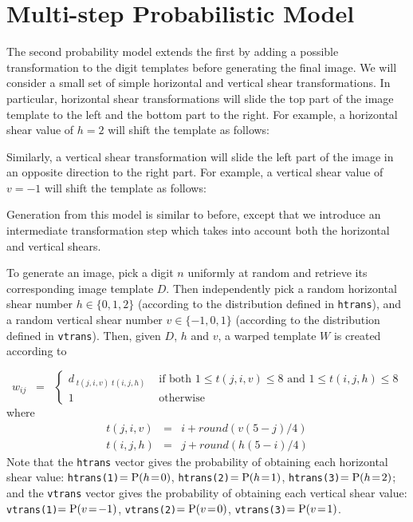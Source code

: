 \documentclass[12pt]{article}
\begin{document}
\section{Multi-step Probabilistic Model}

The second probability model extends the first by adding a possible 
transformation to the digit templates before generating the final image.
We will consider a small set of simple 
horizontal and vertical shear transformations.
In particular, horizontal shear transformations
will slide the top part of the image template to the left
and the bottom part to the right.
For example, a horizontal shear value of $h=2$ 
will shift the template as follows:



\noindent
Similarly, a vertical shear transformation will
slide the left part of the image
in an opposite direction to the right part.
For example, a vertical shear value of $v=-1$
will shift the template as follows:

\bigskip

\hspace*{2.2em}

\hspace*{1.49cm}

Generation from this model is similar to before,
except that we introduce an intermediate transformation
step which takes into account both the horizontal and
vertical shears.

\begin{center}

\end{center}

To generate an image, 
pick a digit $n$ uniformly at random 
and retrieve its corresponding image template $D$.
Then independently pick a random horizontal shear number $h\in\{0,1,2\}$
(according to the distribution defined in {\tt htrans}),
and
a random vertical shear number $v\in\{-1,0,1\}$
(according to the distribution defined in {\tt vtrans}).
Then, given $D$, $h$ and $v$, a warped template $W$ is created according to

\[
w_{ij} \;\;=\;\;\left\{
\begin{array}{ll}
d_{\;t(j,i,v)\;t(i,j,h)}
& \mbox{ if both $1\leq t(j,i,v)\leq 8$ and $1\leq t(i,j,h)\leq 8$}
\\[2ex]
1 & \mbox{ otherwise}
\end{array}
\right.
\]
where
%
\begin{eqnarray*}
t(j,i,v) & = & i+round(v(5-j)/4)
\\
t(i,j,h) & = & j+round(h(5-i)/4)
\end{eqnarray*}
%
Note that the
{\tt htrans} vector gives the probability of obtaining each 
horizontal shear value:
{\tt htrans(1)}$={\rm P}(h\!=\!0)$,
{\tt htrans(2)}$={\rm P}(h\!=\!1)$,
{\tt htrans(3)}$={\rm P}(h\!=\!2)$;
and
the {\tt vtrans} vector gives the probability of obtaining each 
vertical shear value:
{\tt vtrans(1)}$={\rm P}(v\!=\!-1)$,
{\tt vtrans(2)}$={\rm P}(v\!=\!0)$,
{\tt vtrans(3)}$={\rm P}(v\!=\!1)$.
\end{document}
